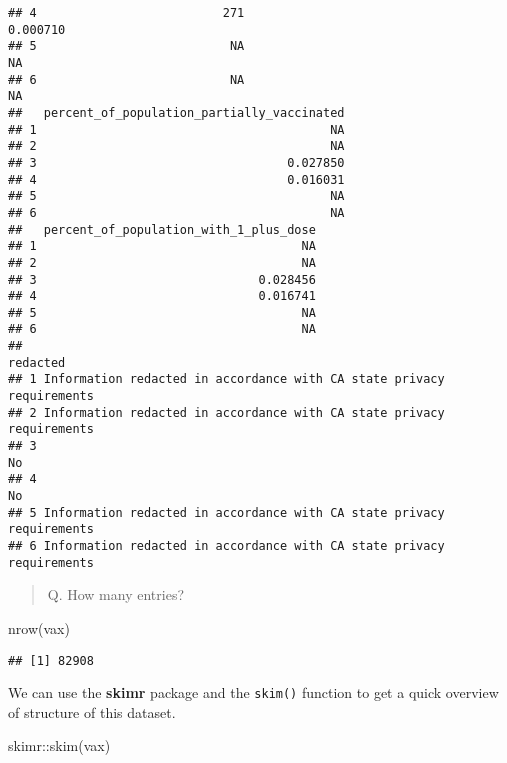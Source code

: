 \documentclass[
]{article}
\newenvironment{Shaded}{\begin{snugshade}}{\end{snugshade}}
\newcommand{\FunctionTok}[1]{\textcolor[rgb]{0.00,0.00,0.00}{#1}}
\newcommand{\NormalTok}[1]{#1}
\newcommand{\SpecialCharTok}[1]{\textcolor[rgb]{0.00,0.00,0.00}{#1}}
\begin{document}
\begin{verbatim}
## 4                          271                               0.000710
## 5                           NA                                     NA
## 6                           NA                                     NA
##   percent_of_population_partially_vaccinated
## 1                                         NA
## 2                                         NA
## 3                                   0.027850
## 4                                   0.016031
## 5                                         NA
## 6                                         NA
##   percent_of_population_with_1_plus_dose
## 1                                     NA
## 2                                     NA
## 3                               0.028456
## 4                               0.016741
## 5                                     NA
## 6                                     NA
##                                                                redacted
## 1 Information redacted in accordance with CA state privacy requirements
## 2 Information redacted in accordance with CA state privacy requirements
## 3                                                                    No
## 4                                                                    No
## 5 Information redacted in accordance with CA state privacy requirements
## 6 Information redacted in accordance with CA state privacy requirements
\end{verbatim}

\begin{quote}
Q. How many entries?
\end{quote}

\begin{Shaded}
\begin{Highlighting}[]
\FunctionTok{nrow}\NormalTok{(vax)}
\end{Highlighting}
\end{Shaded}

\begin{verbatim}
## [1] 82908
\end{verbatim}

We can use the \textbf{skimr} package and the \texttt{skim()} function
to get a quick overview of structure of this dataset.

\begin{Shaded}
\begin{Highlighting}[]
\NormalTok{skimr}\SpecialCharTok{::}\FunctionTok{skim}\NormalTok{(vax)}
\end{Highlighting}
\end{Shaded}
\end{document}
